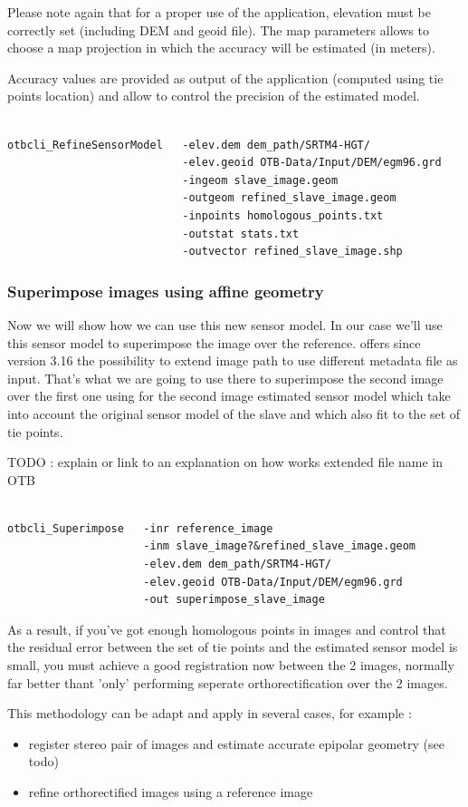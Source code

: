 Please note again that for a proper use of the application, elevation must be
correctly set (including DEM and geoid file). The map parameters allows to
choose a map projection in which the accuracy will be estimated (in meters).

Accuracy values are provided as output of the application (computed using tie points location) and allow to control the precision of
the estimated model.

\begin{verbatim}

otbcli_RefineSensorModel   -elev.dem dem_path/SRTM4-HGT/
                           -elev.geoid OTB-Data/Input/DEM/egm96.grd
                           -ingeom slave_image.geom
                           -outgeom refined_slave_image.geom
                           -inpoints homologous_points.txt
                           -outstat stats.txt
                           -outvector refined_slave_image.shp

\end{verbatim}

\subsubsection{Superimpose images using affine geometry}

Now we will show how we can use this new sensor model. In our case we'll use
this sensor model to superimpose the image over the reference. \otb offers since
version 3.16 the possibility to extend image path to use different metadata file
as input. That's what we are going to use there to superimpose the second image
over the first one using for the second image estimated sensor model which take
into account the original sensor model of the slave and which also fit to the
set of tie points.

TODO : explain or link to an explanation on how works extended file name in OTB

\begin{verbatim}

otbcli_Superimpose   -inr reference_image
                     -inm slave_image?&refined_slave_image.geom
                     -elev.dem dem_path/SRTM4-HGT/
                     -elev.geoid OTB-Data/Input/DEM/egm96.grd
                     -out superimpose_slave_image

\end{verbatim}

As a result, if you've got enough homologous points in images and control that
the residual error between the set of tie points and the estimated sensor model
is small, you must achieve a good registration now between the 2 images, normally far better thant 'only' performing seperate orthorectification over the 2 images.

This methodology can be adapt and apply in several cases, for example :
\begin{itemize}

\item register stereo pair of images and estimate accurate epipolar geometry (see todo)
\item refine orthorectified images using a reference image

\end{itemize}
